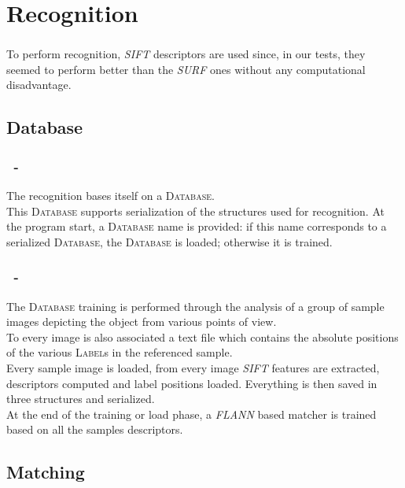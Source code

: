 \documentclass{beamer}
\begin{document}
  \section{Recognition}

  \begin{frame}
    \frametitle{\insertsection}
    To perform recognition, \emph{SIFT} descriptors are used since, in our
    tests, they seemed to perform better than the \emph{SURF} ones without any
    computational disadvantage.\\
  \end{frame}

  \subsection{Database}
  
  \begin{frame}
    \frametitle{\insertsection\ - \insertsubsection}
    The recognition bases itself on a \textsc{Database}.\\
    This \textsc{Database} supports serialization of the structures used for
    recognition. At the program start, a \textsc{Database} name is provided:
    if this name corresponds to a serialized \textsc{Database}, the
    \textsc{Database} is loaded; otherwise it is trained.\\
  \end{frame}

  \begin{frame}
    \frametitle{\insertsection\ - \insertsubsection}
    The \textsc{Database} training is performed through the analysis of a group
    of sample images depicting the object from various points of view.\\
    To every image is also associated a text file which contains the absolute
    positions of the various \textsc{Label}s in the referenced sample.\\
    Every sample image is loaded, from every image \emph{SIFT} features are
    extracted, descriptors computed and label positions loaded. Everything
    is then saved in three structures and serialized.\\
    At the end of the training or load phase, a \emph{FLANN} based matcher is
    trained based on all the samples descriptors.\\
  \end{frame}

  \subsection{Matching}
\end{document}
